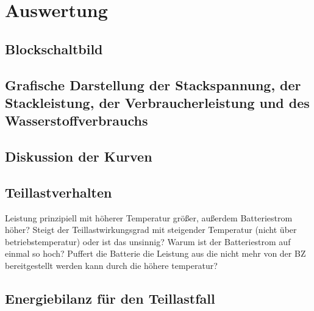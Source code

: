 \section{Auswertung}
\label{sec:Auswertung}


\subsection{Blockschaltbild}
\subsection{Grafische Darstellung der Stackspannung, der
Stackleistung, der Verbraucherleistung und des Wasserstoffverbrauchs}

\subsection{}
\subsection{Diskussion der Kurven}
\subsection{}
\subsection{Teillastverhalten}

Leistung prinzipiell mit höherer Temperatur größer, außerdem Batteriestrom höher? 
Steigt der Teillastwirkungsgrad mit steigender Temperatur (nicht über betriebstemperatur) oder ist das unsinnig?
Warum ist der Batteriestrom auf einmal so hoch? Puffert die Batterie die Leistung aus die nicht mehr von der BZ bereitgestellt werden kann durch die höhere temperatur?



\subsection{Energiebilanz für den Teillastfall}